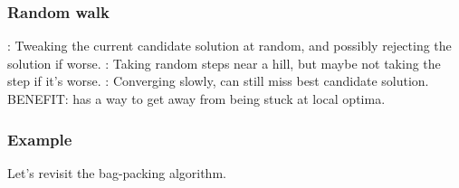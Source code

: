 \documentclass[11pt]{beamer}
\begin{document}
\iffalse
\begin{frame}[fragile]
  \frametitle{Random sampling}
  \Enlarge

  \begin{enumerate}
  \myitem  {\textbf Strategy}:  Choosing at random a candidate solution (sometimes within a constrained space). \pause
  \myitem  {\textbf Analogy}:  Picking random heights in the region of a hill, accepting the tallest as the highest. \pause
  \myitem  {\textbf Pitfall}:  Without good constraints, can miss the optimum value.
  \end{enumerate}
\end{frame}
\fi

\begin{frame}[fragile]
  \frametitle{Random walk}
  \Enlarge

  \begin{enumerate}
  :  Tweaking the current candidate solution at random, and possibly rejecting the solution if worse. \pause
  :  Taking random steps near a hill, but maybe not taking the step if it's worse. \pause
  :  Converging slowly, can still miss best candidate solution.  BENEFIT:  has a way to get away from being stuck at local optima.
  \end{enumerate}
\end{frame}

\begin{frame}[fragile]
  \frametitle{Example}
  \Enlarge

  \begin{enumerate}
  \myitem  Let's revisit the bag-packing algorithm.
  \end{enumerate}
\end{frame}
\end{document}
